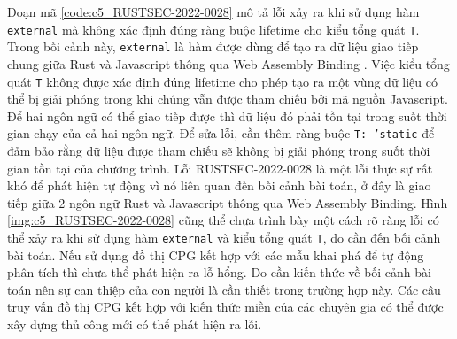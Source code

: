 Đoạn mã \ref{code:c5_RUSTSEC-2022-0028} mô tả lỗi xảy ra khi sử dụng hàm \texttt{external} mà không xác định đúng ràng buộc lifetime cho kiểu tổng quát \texttt{T}.
Trong bối cảnh này, \texttt{external} là hàm được dùng để tạo ra dữ liệu giao tiếp chung giữa Rust và Javascript thông qua Web Assembly Binding \cite{ githubGitHubRustwasmwasmbindgen}.
Việc kiểu tổng quát \texttt{T} không được xác định đúng lifetime cho phép tạo ra một vùng dữ liệu có thể bị giải phóng trong khi chúng vẫn được tham chiếu bởi mã nguồn Javascript.
Để hai ngôn ngữ có thể giao tiếp được thì dữ liệu đó phải tồn tại trong suốt thời gian chạy của cả hai ngôn ngữ.
Để sửa lỗi, cần thêm ràng buộc \texttt{T: 'static} để đảm bảo rằng dữ liệu được tham chiếu sẽ không bị giải phóng trong suốt thời gian tồn tại của chương trình.
Lỗi RUSTSEC-2022-0028 là một lỗi thực sự rất khó để phát hiện tự động vì nó liên quan đến bối cảnh bài toán, ở đây là giao tiếp giữa 2 ngôn ngữ Rust và Javascript thông qua Web Assembly Binding.
Hình \ref{img:c5_RUSTSEC-2022-0028} cũng thể chưa trình bày một cách rõ ràng lỗi có thể xảy ra khi sử dụng hàm \texttt{external} và kiểu tổng quát \texttt{T}, do cần đến bối cảnh bài toán.
Nếu sử dụng đồ thị CPG kết hợp với các mẫu khai phá để tự động phân tích thì chưa thể phát hiện ra lỗ hổng.
Do cần kiến thức về bối cảnh bài toán nên sự can thiệp của con người là cần thiết trong trường hợp này.
Các câu truy vấn đồ thị CPG kết hợp với kiến thức miền của các chuyên gia có thể được xây dựng thủ công mới có thể phát hiện ra lỗi.




